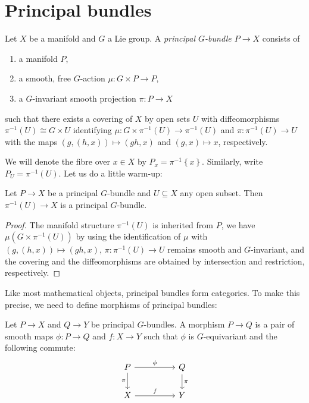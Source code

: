 \documentclass{article}
\begin{document}
\section{Principal bundles}

\begin{definition}
  Let $X$ be a manifold and $G$ a Lie group. A \emph{principal $G$-bundle
  $P\to X$} consists of
  \begin{enumerate}
    \item a manifold $P$,
    \item a smooth, free $G$-action $\mu:G\times P\to P$,
    \item a $G$-invariant smooth projection $\pi:P\to X$
  \end{enumerate}
  such that there exists a covering of $X$ by open sets
  $U$ with diffeomorphisms ${\pi}^{-1}(U)\cong G\times U$
  identifying $\mu : G\times{\pi}^{-1}(U)\to{\pi}^{-1}(U)$
  and $\pi:{\pi}^{-1}(U)\to U$ with the maps
  $(g,(h,x))\mapsto (gh,x)$ and $(g,x)\mapsto x$, respectively.
\end{definition}

We will denote the fibre over $x\in X$ by $P_x = {\pi}^{-1}\left\lbrace{x}\right\rbrace$. Similarly, write $P_U = {\pi}^{-1}(U)$.
Let us do a little warm-up:

\begin{lemma}
  Let $P\to X$ be a principal $G$-bundle and $U\subseteq X$ any open
  subset. Then ${\pi}^{-1}(U)\to X$
  is a principal $G$-bundle.
  \begin{proof}
    The manifold structure ${\pi}^{-1}(U)$ is inherited from $P$,
    we have $\mu(G\times{\pi}^{-1}(U))$ by using the identification
    of $\mu$ with $(g,(h,x))\mapsto (gh,x)$, $\pi:{\pi}^{-1}(U)\to U$
    remains smooth and $G$-invariant, and the covering and the
    diffeomorphisms are obtained by intersection and restriction, respectively.
  \end{proof}
\end{lemma}

Like most mathematical objects, principal bundles form categories.
To make this precise, we need to define morphisms of principal bundles:

\begin{definition}
  Let $P \to X$ and $Q\to Y$ be principal $G$-bundles.
  A morphism $P\to Q$ is a pair of smooth maps $\phi:P\to Q$ and $f:X\to Y$
  such that $\phi$ is $G$-equivariant and the following commute:
  \begin{equation*}
    \begin{tikzcd}
      P && Q \\
      X && Y
      \arrow["\phi", from=1-1, to=1-3]
      \arrow["f", from=2-1, to=2-3]
      \arrow["\pi"', from=1-1, to=2-1]
      \arrow["\pi", from=1-3, to=2-3]
    \end{tikzcd}
  \end{equation*}
\end{definition}
\end{document}
